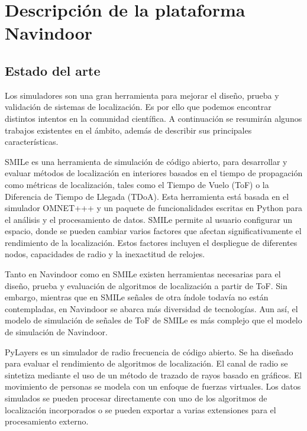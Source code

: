 \chapter{Descripción de la plataforma Navindoor}\label{S3}

\section{Estado del arte}\label{S2}
Los simuladores son una gran herramienta para mejorar el diseño, prueba y validación de sistemas de localización. Es por ello que podemos encontrar distintos intentos en la comunidad científica. A continuación se resumirán algunos trabajos existentes en el ámbito, además de describir sus principales características.

SMILe   es una herramienta de simulación de código abierto, para desarrollar y evaluar métodos de localización en interiores basados en el tiempo de propagación como métricas de localización, tales como el Tiempo de Vuelo (ToF) o la Diferencia de Tiempo de Llegada (TDoA). Esta herramienta está basada en el simulador OMNET+++ y un paquete de funcionalidades escritas en Python para el análisis y el procesamiento de datos. SMILe permite al usuario configurar un espacio, donde se pueden cambiar varios factores que afectan significativamente el rendimiento de la localización. Estos factores incluyen el despliegue de diferentes nodos, capacidades de radio y la inexactitud de relojes.

Tanto en Navindoor como en SMILe existen herramientas necesarias para el diseño, prueba y evaluación de algoritmos de localización a partir de ToF. Sin embargo, mientras que en SMILe señales de otra índole todavía no están contempladas, en Navindoor se abarca más diversidad de tecnologías. Aun así, el modelo de simulación de señales de ToF de SMILe es más complejo que el modelo de simulación de Navindoor. 

PyLayers es un simulador de radio frecuencia de código abierto. Se ha diseñado para evaluar el rendimiento de algoritmos de localización. El canal de radio se sintetiza mediante el uso de un  método de trazado de rayos basado en gráficos. El movimiento de personas se modela con un enfoque de fuerzas virtuales. Los datos simulados se pueden procesar directamente con uno de los algoritmos de localización incorporados o se pueden exportar a varias extensiones para el procesamiento externo. 

